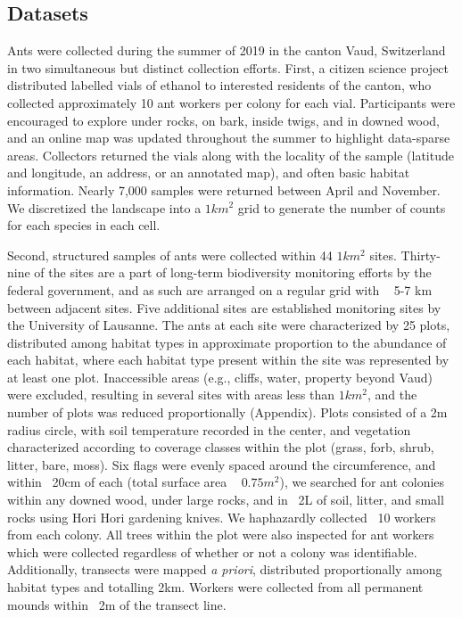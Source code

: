 \documentclass[10pt,a4paper,draft]{article}
\begin{document}
\subsection{Datasets}
Ants were collected during the summer of 2019 in the canton Vaud, Switzerland in two simultaneous but distinct collection efforts. First, a citizen science project distributed labelled vials of ethanol to interested residents of the canton, who collected approximately 10 ant workers per colony for each vial. Participants were encouraged to explore under rocks, on bark, inside twigs, and in downed wood, and an online map was updated throughout the summer to highlight data-sparse areas. Collectors returned the vials along with the locality of the sample (latitude and longitude, an address, or an annotated map), and often basic habitat information. Nearly 7,000 samples were returned between April and November. We discretized the landscape into a $1 km^2$ grid to generate the number of counts for each species in each cell. 

Second, structured samples of ants were collected within 44 $1 km^2$ sites. Thirty-nine of the sites are a part of long-term biodiversity monitoring efforts by the federal government, and as such are arranged on a regular grid with ~ 5-7 km between adjacent sites. Five additional sites are established monitoring sites by the University of Lausanne. The ants at each site were characterized by 25 plots, distributed among habitat types in approximate proportion to the abundance of each habitat, where each habitat type present within the site was represented by at least one plot. Inaccessible areas (e.g., cliffs, water, property beyond Vaud) were excluded, resulting in several sites with areas less than $1 km^2$, and the number of plots was reduced proportionally (Appendix). Plots consisted of a 2m radius circle, with soil temperature recorded in the center, and vegetation characterized according to coverage classes within the plot (grass, forb, shrub, litter, bare, moss). Six flags were evenly spaced around the circumference, and within ~20cm of each (total surface area ~ $0.75 m^2$), we searched for ant colonies within any downed wood, under large rocks, and in ~2L of soil, litter, and small rocks using Hori Hori gardening knives. We haphazardly collected ~10 workers from each colony. All trees within the plot were also inspected for ant workers which were collected regardless of whether or not a colony was identifiable. Additionally, transects were mapped \emph{a priori}, distributed proportionally among habitat types and totalling 2km. Workers were collected from all permanent mounds within ~2m of the transect line. 
\end{document}

